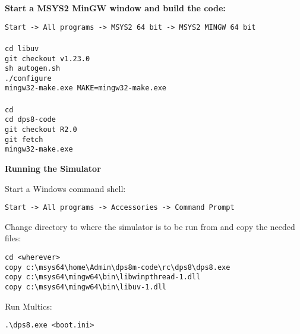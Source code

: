 \textbf{Start a MSYS2 MinGW window and build the code:}

\begin{adjustwidth}{5ex}{1ex}
    \texttt{Start -> All programs -> MSYS2 64 bit -> MSYS2 MINGW 64 bit} \\
\\
    \texttt{cd libuv} \\
    \texttt{git checkout v1.23.0} \\
    \texttt{sh autogen.sh} \\
    \texttt{./configure} \\
    \texttt{mingw32-make.exe MAKE=mingw32-make.exe} \\
\\
    \texttt{cd} \\
    \texttt{cd dps8-code} \\
    \texttt{git checkout R2.0} \\
    \texttt{git fetch} \\
    \texttt{mingw32-make.exe} \\
\end{adjustwidth}  

\textbf{Running the Simulator}

Start a Windows command shell:

\begin{adjustwidth}{5ex}{1ex}
    \texttt{Start -> All programs -> Accessories -> Command Prompt} \\
\end{adjustwidth}  

Change directory to where the simulator is to be run from and copy the needed files:

\begin{adjustwidth}{5ex}{1ex}
    \texttt{cd <wherever>} \\
    \texttt{copy c:\textbackslash{}msys64\textbackslash{}home\textbackslash{}Admin\textbackslash{}dps8m-code\textbackslash{}rc\textbackslash{}dps8\textbackslash{}dps8.exe} \\
    \texttt{copy c:\textbackslash{}msys64\textbackslash{}mingw64\textbackslash{}bin\textbackslash{}libwinpthread-1.dll} \\
    \texttt{copy c:\textbackslash{}msys64\textbackslash{}mingw64\textbackslash{}bin\textbackslash{}libuv-1.dll} \\
\end{adjustwidth}  

Run Multics:

\begin{adjustwidth}{5ex}{1ex}
    \texttt{.\textbackslash{}dps8.exe <boot.ini>} \\
\end{adjustwidth}  


